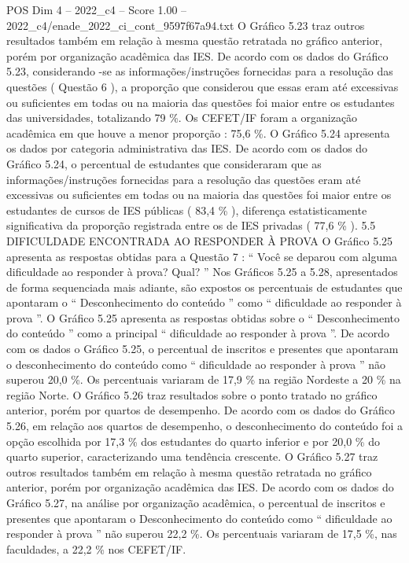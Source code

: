 \begin{textsample}{POS Dim 4 – 2022\_c4 – Score 1.00 – 2022\_c4/enade\_2022\_ci\_cont\_9597f67a94.txt}
O Gráfico 5.23 traz outros resultados também em relação à mesma questão retratada no gráfico anterior, porém por organização acadêmica das IES.
De acordo com os dados do Gráfico 5.23, considerando -se as informações/instruções fornecidas para a resolução das questões ( Questão 6 ), a proporção que considerou que essas eram até excessivas ou suficientes em todas ou na maioria das questões foi maior entre os estudantes das universidades, totalizando 79 \%.
Os CEFET/IF foram a organização acadêmica em que houve a menor proporção : 75,6 \%.
O Gráfico 5.24 apresenta os dados por categoria administrativa das IES.
De acordo com os dados do Gráfico 5.24, o percentual de estudantes que consideraram que as informações/instruções fornecidas para a resolução das questões eram até excessivas ou suficientes em todas ou na maioria das questões foi maior entre os estudantes de cursos de IES públicas ( 83,4 \% ), diferença estatisticamente significativa da proporção registrada entre os de IES privadas ( 77,6 \% ). 5.5 DIFICULDADE ENCONTRADA AO RESPONDER À PROVA O Gráfico 5.25 apresenta as respostas obtidas para a Questão 7 : “ Você se deparou com alguma dificuldade ao responder à prova?
Qual? ” Nos Gráficos 5.25 a 5.28, apresentados de forma sequenciada mais adiante, são expostos os percentuais de estudantes que apontaram o “ Desconhecimento do conteúdo ” como “ dificuldade ao responder à prova ”.
O Gráfico 5.25 apresenta as respostas obtidas sobre o “ Desconhecimento do conteúdo ” como a principal “ dificuldade ao responder à prova ”.
De acordo com os dados o Gráfico 5.25, o percentual de inscritos e presentes que apontaram o desconhecimento do conteúdo como “ dificuldade ao responder à prova ” não superou 20,0 \%.
Os percentuais variaram de 17,9 \% na região Nordeste a 20 \% na região Norte.
O Gráfico 5.26 traz resultados sobre o ponto tratado no gráfico anterior, porém por quartos de desempenho.
De acordo com os dados do Gráfico 5.26, em relação aos quartos de desempenho, o desconhecimento do conteúdo foi a opção escolhida por 17,3 \% dos estudantes do quarto inferior e por 20,0 \% do quarto superior, caracterizando uma tendência crescente.
O Gráfico 5.27 traz outros resultados também em relação à mesma questão retratada no gráfico anterior, porém por organização acadêmica das IES.
De acordo com os dados do Gráfico 5.27, na análise por organização acadêmica, o percentual de inscritos e presentes que apontaram o Desconhecimento do conteúdo como “ dificuldade ao responder à prova ” não superou 22,2 \%.
Os percentuais variaram de 17,5 \%, nas faculdades, a 22,2 \% nos CEFET/IF.

\end{textsample}
